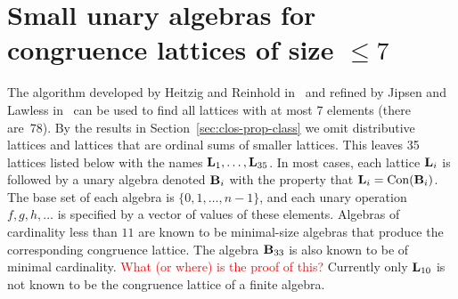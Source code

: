 {%








\section{Small unary algebras for congruence lattices of size $\le 7$}
\label{sec:small-unary-algebras}

The algorithm developed by Heitzig and Reinhold 
in~\cite{HeitzigReinhold2002} and refined by Jipsen and Lawless
in~\cite{JipsenLawless2015} can be used to find all lattices with
at most 7 elements (there are~78). By the results 
in Section~\ref{sec:clos-prop-class}
we omit distributive lattices and lattices that are ordinal sums 
of smaller lattices. This leaves 35 lattices listed below 
with the names $\mathbf{L}_1,\ldots,\mathbf{L}_{35}$. In most cases, 
each lattice $\mathbf{L}_i$ is followed by a
unary algebra denoted $\mathbf{B}_i$ with the property 
that $\mathbf{L}_i=\operatorname{Con}(\mathbf{B}_i)$.
The base set of each algebra is $\{0,1,\dots,n-1\}$, 
and each unary operation $f,g,h,\ldots$ is
specified by a vector of values of these elements.  
Algebras of cardinality less than
$11$ 
are known to be minimal-size algebras that produce the corresponding
congruence lattice. The algebra $\mathbf{B}_{33}$ is also known 
to be of minimal cardinality. 
\textcolor{red}{What (or where) is the proof of this?}
Currently only $\mathbf{L}_{10}$ is not known to be the congruence
lattice of a finite algebra. 

}
